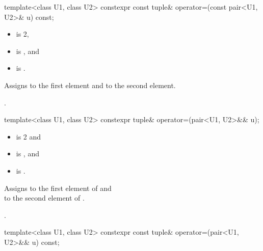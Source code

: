 %
\begin{itemdecl}
template<class U1, class U2> constexpr const tuple& operator=(const pair<U1, U2>& u) const;
\end{itemdecl}

\begin{itemdescr}
\pnum
\constraints
\begin{itemize}
\item
{} is 2,
\item
{} is , and
\item
{} is .
\end{itemize}

\pnum
\effects
Assigns  to the first element and
 to the second element.

\pnum
\returns
{}.
\end{itemdescr}

%
%
\begin{itemdecl}
template<class U1, class U2> constexpr tuple& operator=(pair<U1, U2>&& u);
\end{itemdecl}

\begin{itemdescr}
\pnum
\constraints
\begin{itemize}
\item {} is 2 and
\item {} is , and
\item {} is .
\end{itemize}

\pnum
\effects
Assigns  to the first
element of  and\\  to the
second element of .

\pnum
\returns
{}.
\end{itemdescr}

%
\begin{itemdecl}
template<class U1, class U2> constexpr const tuple& operator=(pair<U1, U2>&& u) const;
\end{itemdecl}

